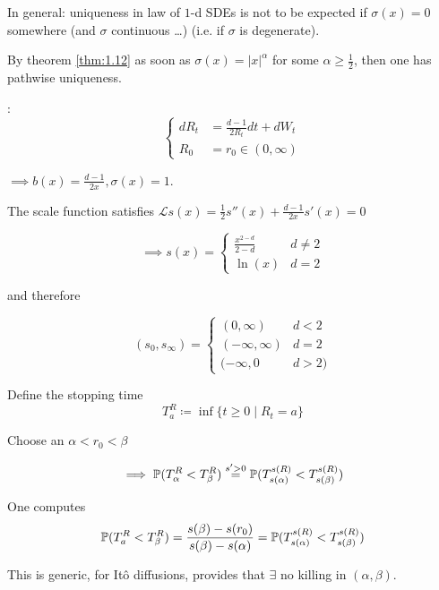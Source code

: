 \begin{remark}
    In general: uniqueness in law of $1$-d SDEs is not to be expected if 
    $\sigma(x)=0$ somewhere (and $\sigma$ continuous \dots) (i.e. if $\sigma$ is degenerate). 
\end{remark}

By theorem \ref{thm:1.12} as soon as $\sigma(x)=|x|^\alpha$ for some $\alpha\geq \frac{1}{2}$,
then one has pathwise uniqueness.

: 
\[\begin{cases}
    dR_t&=\frac{d-1}{2R_t}dt+dW_t\\
    R_0 &=r_0\in (0,\infty)\end{cases}\] 
    
$\implies b(x)=\frac{d-1}{2x},\sigma(x)=1$. 

The scale function satisfies $\mathcal{L}s(x)=\frac{1}{2}s''(x)+\frac{d-1}{2x}s'(x)=0$

\[\implies s(x)=\begin{cases}
    \frac{x^{2-d}}{2-d} & d\neq 2\\
    \ln(x) & d=2
\end{cases}\]

and therefore 

\[(s_0,s_\infty)=\begin{cases}
    (0,\infty) & d<2\\
    (-\infty,\infty) & d=2\\
    (-\infty,0 & d>2)
\end{cases}\]

Define the stopping time
\[T_a^R\coloneqq \inf\{t\geq 0\mid R_t=a\}\]

Choose an $\alpha<r_0<\beta$

\[\implies \mathbb{P}(T_\alpha^R<T_\beta^R)\stackrel{s'>0}{=}\mathbb{P}(T_{s(\alpha)}^{s(R)}<T_{s(\beta)}^{s(R)})\]

One computes
\begin{align*}
    \mathbb{P}(T_a^{R}<T_\beta^R)=\frac{s(\beta)-s(r_0)}{s(\beta)-s(\alpha)}=\mathbb{P}(T_{s(\alpha)}^{s(R)}<T_{s(\beta)}^{s(R)})
\end{align*}

This is generic, for Itô diffusions, provides that $\exists$ no killing in $(\alpha,\beta)$.